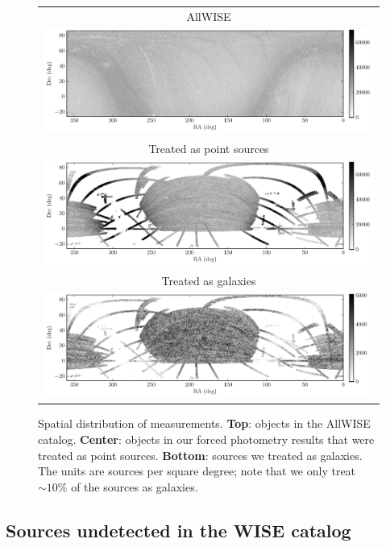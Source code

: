 \documentclass[12pt,preprint]{aastex}
\begin{document}
\begin{figure}
\begin{center}
  \begin{tabular}{@{}c@{}}
    AllWISE \\
    \includegraphics[width=\textwidth]{wmap-00} \\
    Treated as point sources \\
    \includegraphics[width=\textwidth]{map-03} \\
    Treated as galaxies \\
    \includegraphics[width=\textwidth]{map-04}
  \end{tabular}
\end{center}
\caption{Spatial distribution of measurements.  \textbf{Top}: objects
  in the AllWISE catalog.  \textbf{Center}: objects in our forced
  photometry results that were treated as point sources.
  \textbf{Bottom}: sources we treated as galaxies.  The units are
  sources per square degree; note that we only treat $\sim 10\%$ of
  the sources as galaxies.
  \label{fig:maps}}
\end{figure}


\subsection{Sources undetected in the WISE catalog}
\end{document}
